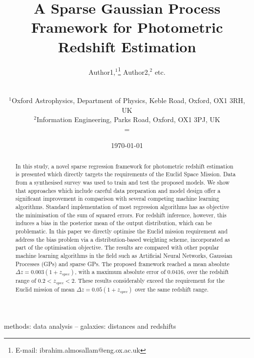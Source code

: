 \documentclass[useAMS,usenatbib,fleqn]{mn2e}
\title[A Sparse Gaussian Process Framework for Photometric Redshift Estimation]{A Sparse Gaussian Process Framework for Photometric Redshift Estimation}
\author[Almosallam et al.]
{\parbox{\textwidth}{Author1,$^1$\thanks{E-mail: ibrahim.almosallam@eng.ox.ac.uk}
Author2,$^{2}$ etc.
}
\vspace{0.4cm}\\
\parbox{\textwidth}{
$^1$Oxford Astrophysics, Department of Physics, Keble Road, Oxford, OX1 3RH, UK\\
$^2$Information Engineering, Parks Road, Oxford, OX1 3PJ, UK\\=
}}
\begin{document}
\date{\today}

\pagerange{\pageref{firstpage}--\pageref{lastpage}} 

\maketitle

\label{firstpage}

\begin{abstract}
In this study, a novel sparse regression framework for photometric redshift estimation is presented which directly targets the requirements of the Euclid Space Mission. Data from a synthesised survey was used to train and test the proposed models. We show that approaches which include careful data preparation and model design offer a significant improvement in comparison with several competing machine learning algorithms. Standard implementation of most regression algorithms has as objective the minimisation of the sum of squared errors. For redshift inference, however, this induces a bias in the posterior mean of the output distribution, which can be problematic. In this paper we directly optimise the Euclid mission requirement and address the bias problem via a distribution-based weighting scheme, incorporated as part of the optimisation objective. The results are compared with other popular machine learning algorithms in the field such as Artificial Neural Networks, Gaussian Processes (GPs) and sparse GPs. The proposed framework reached a mean absolute $\Delta z = 0.003(1+z_{spec})$, with a maximum absolute error of 0.0416, over the redshift range of $0.2 < z_{spec} < 2$. These results considerably exceed the requirement for the Euclid mission of mean $\Delta z = 0.05(1+z_{spec})$ over the same redshift range.	
\end{abstract}

\begin{keywords}
methods: data analysis -- galaxies: distances and redshifts
\end{keywords}
\end{document}
